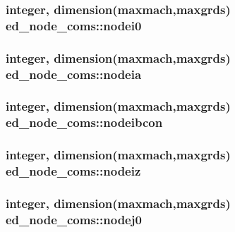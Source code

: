 \subsubsection[{nodei0}]{\setlength{\rightskip}{0pt plus 5cm}integer, dimension(maxmach,maxgrds) ed\+\_\+node\+\_\+coms\+::nodei0}\label{namespaceed__node__coms_a1c7fca6c0b4e16a6c824966437383262}
\hypertarget{namespaceed__node__coms_a829855ba74deed2626857b865e7408da}{}
\subsubsection[{nodeia}]{\setlength{\rightskip}{0pt plus 5cm}integer, dimension(maxmach,maxgrds) ed\+\_\+node\+\_\+coms\+::nodeia}\label{namespaceed__node__coms_a829855ba74deed2626857b865e7408da}
\hypertarget{namespaceed__node__coms_acbb4bfd87dc840f6823b6a5ae9753040}{}
\subsubsection[{nodeibcon}]{\setlength{\rightskip}{0pt plus 5cm}integer, dimension(maxmach,maxgrds) ed\+\_\+node\+\_\+coms\+::nodeibcon}\label{namespaceed__node__coms_acbb4bfd87dc840f6823b6a5ae9753040}
\hypertarget{namespaceed__node__coms_ac7587c43282c2cc903564724b117098b}{}
\subsubsection[{nodeiz}]{\setlength{\rightskip}{0pt plus 5cm}integer, dimension(maxmach,maxgrds) ed\+\_\+node\+\_\+coms\+::nodeiz}\label{namespaceed__node__coms_ac7587c43282c2cc903564724b117098b}
\hypertarget{namespaceed__node__coms_a8cb55126a161c5cf71f938898292cf77}{}
\subsubsection[{nodej0}]{\setlength{\rightskip}{0pt plus 5cm}integer, dimension(maxmach,maxgrds) ed\+\_\+node\+\_\+coms\+::nodej0}\label{namespaceed__node__coms_a8cb55126a161c5cf71f938898292cf77}
\hypertarget{namespaceed__node__coms_a116c403afd361d69151547dc435f4fbb}{}
